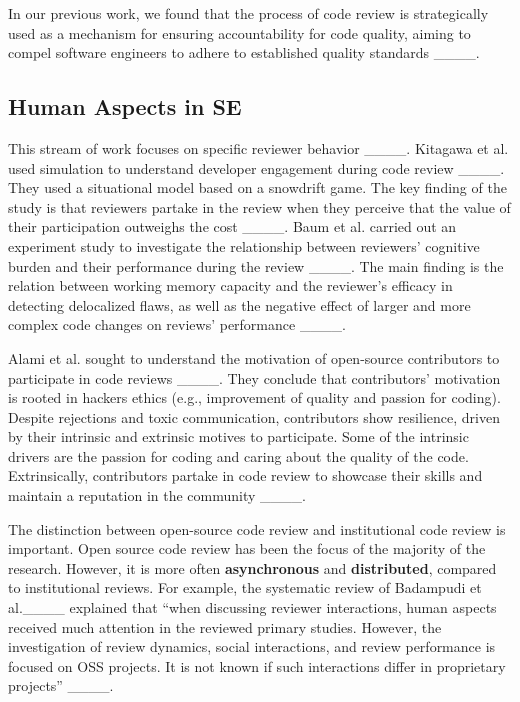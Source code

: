 In our previous work, we found that the process of code review is strategically used as a mechanism for ensuring accountability for code quality, aiming to compel software engineers to adhere to established quality standards ____.

\subsection{Human Aspects in SE}

This stream of work focuses on specific reviewer behavior ____. Kitagawa et al. used simulation to understand developer engagement during code review ____. They used a situational model based on a snowdrift game. The key finding of the study is that reviewers partake in the review when they perceive that the value of their participation outweighs the cost ____. Baum et al. carried out an experiment study to investigate the relationship between reviewers' cognitive burden and their performance during the review ____. The main finding is the relation between working memory capacity and the reviewer's efficacy in detecting delocalized flaws, as well as the negative effect of larger and more complex code changes on reviews' performance ____.

Alami et al. sought to understand the motivation of open-source contributors to participate in code reviews ____. They conclude that contributors' motivation is rooted in hackers ethics (e.g., improvement of quality and passion for coding). Despite rejections and toxic communication, contributors show resilience, driven by their intrinsic and extrinsic motives to participate. Some of the intrinsic drivers are the passion for coding and caring about the quality of the code. Extrinsically, contributors partake in code review to showcase their skills and maintain a reputation in the community ____.

The distinction between open-source code review and institutional code review is important. Open source code review has been the focus of the majority of the research. However, it is more often \textbf{asynchronous} and \textbf{distributed}, compared to institutional reviews. For example, the systematic review of Badampudi et al.____ explained that ``when discussing reviewer interactions, human aspects received much attention in the reviewed primary studies. However, the investigation of review dynamics, social interactions, and review performance is focused on OSS projects. It is not known if such interactions differ in proprietary projects'' ____.

